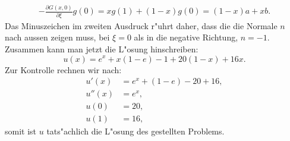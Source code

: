 \begin{loesung}
\begin{align*}
-
\frac{\partial G(x,0)}{\partial\xi} g(0)
=
xg(1) + (1-x)g(0)
=
(1-x)a
+
xb.
\end{align*}
Das Minuszeichen im zweiten Ausdruck r"uhrt daher, dass die die Normale $n$
nach aussen zeigen muss, bei $\xi=0$ als in die negative Richtung, $n=-1$.
Zusammen kann man jetzt die L"osung hinschreiben:
\[
u(x)
=
e^x+x(1-e)-1
+20(1-x)+16x.
\]
Zur Kontrolle rechnen wir nach:
\begin{align*}
u'(x)
&=
e^x+(1-e)-20+16,
\\
u''(x)
&=
e^x,
\\
u(0)
&=
20,
\\
u(1)
&=
16,
\end{align*}
somit ist $u$ tats"achlich die L"osung des gestellten Problems.
\end{loesung}

